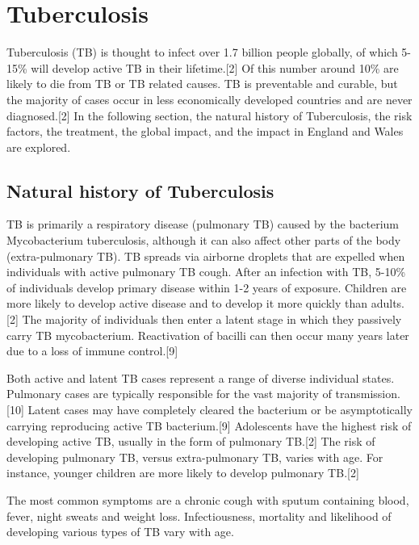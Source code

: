 \documentclass[11pt,twoside]{bristolthesis}
\begin{document}
  \hypertarget{tuberculosis}{%
  \section{Tuberculosis}\label{tuberculosis}}
  
  Tuberculosis (TB) is thought to infect over 1.7 billion people globally, of which 5-15\% will develop active TB in their lifetime.{[}2{]} Of this number around 10\% are likely to die from TB or TB related causes. TB is preventable and curable, but the majority of cases occur in less economically developed countries and are never diagnosed.{[}2{]} In the following section, the natural history of Tuberculosis, the risk factors, the treatment, the global impact, and the impact in England and Wales are explored.
  
  \hypertarget{natural-history-of-tuberculosis}{%
  \subsection{Natural history of Tuberculosis}\label{natural-history-of-tuberculosis}}
  
  TB is primarily a respiratory disease (pulmonary TB) caused by the bacterium Mycobacterium tuberculosis, although it can also affect other parts of the body (extra-pulmonary TB). TB spreads via airborne droplets that are expelled when individuals with active pulmonary TB cough. After an infection with TB, 5-10\% of individuals develop primary disease within 1-2 years of exposure. Children are more likely to develop active disease and to develop it more quickly than adults.{[}2{]} The majority of individuals then enter a latent stage in which they passively carry TB mycobacterium. Reactivation of bacilli can then occur many years later due to a loss of immune control.{[}9{]}
  
  Both active and latent TB cases represent a range of diverse individual states. Pulmonary cases are typically responsible for the vast majority of transmission.{[}10{]} Latent cases may have completely cleared the bacterium or be asymptotically carrying reproducing active TB bacterium.{[}9{]} Adolescents have the highest risk of developing active TB, usually in the form of pulmonary TB.{[}2{]} The risk of developing pulmonary TB, versus extra-pulmonary TB, varies with age. For instance, younger children are more likely to develop pulmonary TB.{[}2{]}
  
  The most common symptoms are a chronic cough with sputum containing blood, fever, night sweats and weight loss. Infectiousness, mortality and likelihood of developing various types of TB vary with age.
  
\end{document}
